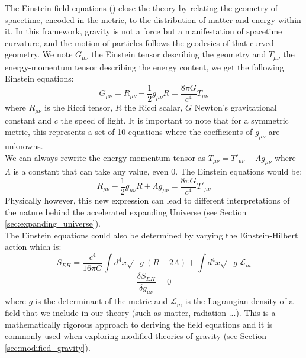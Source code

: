 The Einstein field equations (\cite{Einstein_1916}) close the theory by relating the geometry of spacetime, encoded in the metric, to the distribution of matter 
and energy within it. In this framework, gravity is not a force but a manifestation of spacetime curvature, and the motion of particles follows the geodesics of that 
curved geometry. We note $G_{\mu \nu}$ the Einstein tensor describing the geometry and $ T_{\mu \nu} $ the energy-momentum tensor describing the energy content, we get the 
following Einstein equations: 
\begin{equation}
    \boxed{G_{\mu \nu} = R_{\mu \nu} - \frac{1}{2}g_{\mu \nu}R = \frac{8\pi G}{c^4}T_{\mu \nu}}
\end{equation}
where $R_{\mu \nu}$ is the Ricci tensor, $R$ the Ricci scalar, $G$ Newton's gravitational constant and $c$ the speed of light. It is important to note that 
for a symmetric metric, this represents a set of 10 equations where the coefficients of $g_{\mu \nu}$ are unknowns.\\

We can always rewrite the energy momentum tensor as $T_{\mu \nu} = T'_{\mu \nu} - \Lambda g_{\mu \nu}$ where 
$\Lambda$ is a constant that can take any value, even 0. The Einstein equations would be:
\begin{equation}
    R_{\mu \nu} - \frac{1}{2}g_{\mu \nu}R  + \Lambda g_{\mu \nu} = \frac{8\pi G}{c^4}T'_{\mu \nu}
    \label{eqn:einstein_lambda}
\end{equation} 
Physically however, this new expression can lead to different interpretations of the nature behind the accelerated expanding Universe (see Section \ref{sec:expanding_universe}). \\

The Einstein equations could also be determined by varying the Einstein-Hilbert action which is:
\begin{equation}
    S_{EH} = \frac{c^4}{16 \pi G}\int d^4x \sqrt{-g}(R-2\Lambda) + \int d^4x \sqrt{-g} \mathcal{L}_m
\end{equation}
\begin{equation}
    \frac{\delta S_{EH}}{\delta g_{\mu \nu}} = 0
\end{equation}
where $g$ is the determinant of the metric and $\mathcal{L}_m$ is the Lagrangian density of a field that we include in our theory (such as matter, radiation ...).
This is a mathematically rigorous approach to deriving the field equations and it is commonly used when exploring modified theories of gravity (see Section \ref{sec:modified_gravity}).\\


